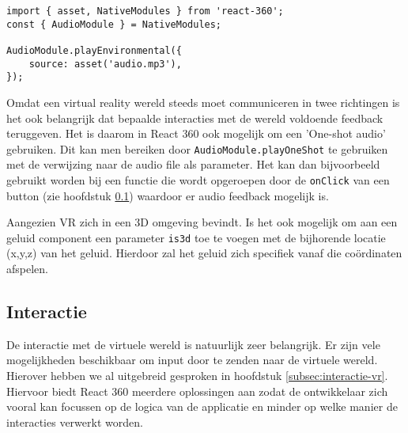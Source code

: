 \begin{lstlisting}[frame=single, caption=Voorbeeld van geluid in React 360]
import { asset, NativeModules } from 'react-360';
const { AudioModule } = NativeModules;

AudioModule.playEnvironmental({
	source: asset('audio.mp3'),
});
\end{lstlisting}

Omdat een virtual reality wereld steeds moet communiceren in twee richtingen is het ook belangrijk dat bepaalde interacties met de wereld voldoende feedback teruggeven. Het is daarom in React 360 ook mogelijk om een 'One-shot audio' gebruiken. Dit kan men bereiken door \lstinline[basicstyle=\ttfamily\color{red}]|AudioModule.playOneShot| te gebruiken met de verwijzing naar de audio file als parameter. Het kan dan bijvoorbeeld gebruikt worden bij een functie die wordt opgeroepen door de \lstinline[basicstyle=\ttfamily\color{red}]|onClick| van een button (zie hoofdstuk \ref{subsec:input-vr}) waardoor er audio feedback mogelijk is.

Aangezien VR zich in een 3D omgeving bevindt. Is het ook mogelijk om aan een geluid component een parameter \lstinline[basicstyle=\ttfamily\color{red}]|is3d| toe te voegen met de bijhorende locatie (x,y,z) van het geluid. Hierdoor zal het geluid zich specifiek vanaf die coördinaten afspelen.


\subsection{Interactie}
\label{subsec:input-vr}
De interactie met de virtuele wereld is natuurlijk zeer belangrijk. Er zijn vele mogelijkheden beschikbaar om input door te zenden naar de virtuele wereld. Hierover hebben we al uitgebreid gesproken in hoofdstuk \ref{subsec:interactie-vr}. Hiervoor biedt React 360 meerdere oplossingen aan zodat de ontwikkelaar zich vooral kan focussen op de logica van de applicatie en minder op welke manier de interacties verwerkt worden.

